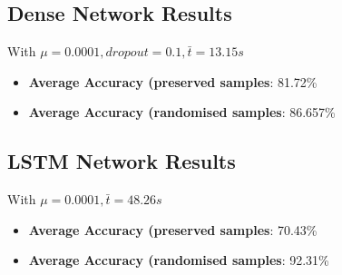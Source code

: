 \documentclass[12pt]{article}
\begin{document}
\subsection{Dense Network Results}
With $\mu=0.0001, \textit{dropout}=0.1, \bar{t}=13.15s$
\begin{itemize}
\item \textbf{Average Accuracy (preserved samples}: 81.72\%
\item \textbf{Average Accuracy (randomised samples}: 86.657\%
\end{itemize}

\subsection{LSTM Network Results}
With $\mu=0.0001, \bar{t}=48.26s$
\begin{itemize}
\item \textbf{Average Accuracy (preserved samples}: 70.43\%
\item \textbf{Average Accuracy (randomised samples}: 92.31\%
\end{itemize}


\end{document}
